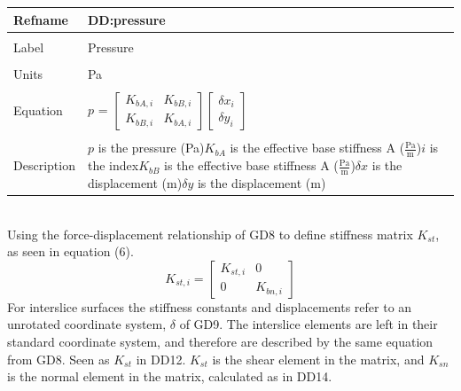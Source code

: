 \documentclass[12pt]{article}
\begin{document}
\noindent \begin{minipage}{\textwidth}
\begin{tabular}{p{} p{}}
\toprule \textbf{Refname} & \textbf{DD:pressure}
\label{DD:pressure}
\\ \midrule \\
Label & Pressure
\\ \midrule \\
Units & Pa
\\ \midrule \\
Equation & $p$ = $\begin{bmatrix}
{K_{bA,i}} & {K_{bB,i}}\\
{K_{bB,i}} & {K_{bA,i}}
\end{bmatrix} \begin{bmatrix}
{\delta{}x}_{i}\\
{\delta{}y}_{i}
\end{bmatrix}$
\\ \midrule \\
Description & $p$ is the pressure (Pa)\newline${K_{bA}}$ is the effective base stiffness A ($\frac{\text{Pa}}{\text{m}}$)\newline$i$ is the index\newline${K_{bB}}$ is the effective base stiffness A ($\frac{\text{Pa}}{\text{m}}$)\newline$\delta{}x$ is the displacement (m)\newline$\delta{}y$ is the displacement (m)
\\ \bottomrule \end{tabular}
\end{minipage}\\
Using the force-displacement relationship of GD8 to define stiffness matrix ${K_{st}}$, as seen in equation (6).
\begin{dmath}
{K_{st,i}}=\begin{bmatrix}
{K_{st,i}} & 0\\
0 & {K_{bn,i}}
\end{bmatrix}
\end{dmath}
For interslice surfaces the stiffness constants and displacements refer to an unrotated coordinate system, $\delta{}$ of GD9. The interslice elements are left in their standard coordinate system, and therefore are described by the same equation from GD8. Seen as ${K_{st}}$ in DD12. ${K_{st}}$ is the shear element in the matrix, and ${K_{sn}}$ is the normal element in the matrix, calculated as in DD14.
\end{document}
